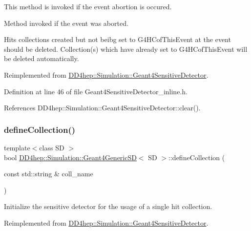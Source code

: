 This method is invoked if the event abortion is occured. 

Method invoked if the event was aborted.

Hits collections created but not beibg set to G4\+H\+Cof\+This\+Event at the event should be deleted. Collection(s) which have already set to G4\+H\+Cof\+This\+Event will be deleted automatically. 

Reimplemented from \hyperlink{class_d_d4hep_1_1_simulation_1_1_geant4_sensitive_detector_a594a8e0083028c98326f99ace2f0f8dd}{D\+D4hep\+::\+Simulation\+::\+Geant4\+Sensitive\+Detector}.



Definition at line 46 of file Geant4\+Sensitive\+Detector\+\_\+inline.\+h.



References D\+D4hep\+::\+Simulation\+::\+Geant4\+Sensitive\+Detector\+::clear().

\hypertarget{class_d_d4hep_1_1_simulation_1_1_geant4_generic_s_d_a3c70c7c1f1be8bd0e6364327e28228e4}{}\label{class_d_d4hep_1_1_simulation_1_1_geant4_generic_s_d_a3c70c7c1f1be8bd0e6364327e28228e4} 
\subsubsection{\texorpdfstring{define\+Collection()}{defineCollection()}}
{\footnotesize\ttfamily template$<$class SD $>$ \\
bool \hyperlink{class_d_d4hep_1_1_simulation_1_1_geant4_generic_s_d}{D\+D4hep\+::\+Simulation\+::\+Geant4\+Generic\+SD}$<$ SD $>$\+::define\+Collection (\begin{DoxyParamCaption}\item[{const std\+::string \&}]{coll\+\_\+name }\end{DoxyParamCaption})\hspace{0.3cm}{\ttfamily [virtual]}}



Initialize the sensitive detector for the usage of a single hit collection. 



Reimplemented from \hyperlink{class_d_d4hep_1_1_simulation_1_1_geant4_sensitive_detector_a4664d651826df03d0aba6f25a385b862}{D\+D4hep\+::\+Simulation\+::\+Geant4\+Sensitive\+Detector}.




